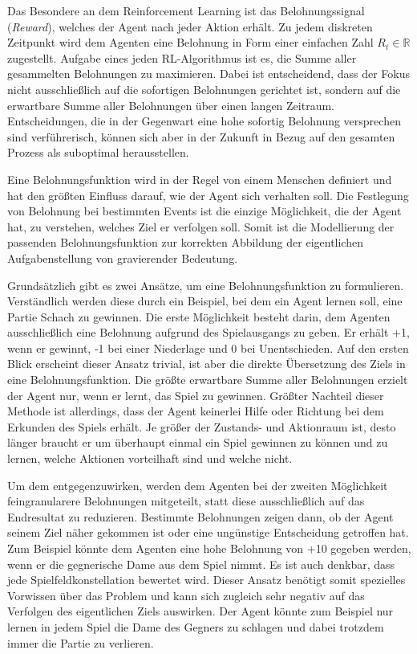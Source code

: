 Das Besondere an dem Reinforcement Learning ist das Belohnungssignal (\textit{Reward}), welches der Agent nach jeder Aktion erhält. Zu jedem diskreten Zeitpunkt wird dem Agenten eine Belohnung in Form einer einfachen Zahl $R_t \in \mathbb{R}$ zugestellt. Aufgabe eines jeden RL-Algorithmus ist es, die Summe aller gesammelten Belohnungen zu maximieren. Dabei ist entscheidend, dass der Fokus nicht ausschließlich auf die sofortigen Belohnungen gerichtet ist, sondern auf die erwartbare Summe aller Belohnungen über einen langen Zeitraum. Entscheidungen, die in der Gegenwart eine hohe sofortig Belohnung versprechen sind verführerisch, können sich aber in der Zukunft in Bezug auf den gesamten Prozess als suboptimal herausstellen. \cite[~S.53]{Sutton1998}
\par 
Eine Belohnungsfunktion wird in der Regel von einem Menschen definiert und hat den größten Einfluss darauf, wie der Agent sich verhalten soll. Die Festlegung von Belohnung bei bestimmten Events ist die einzige Möglichkeit, die der Agent hat, zu verstehen, welches Ziel er verfolgen soll. Somit ist die Modellierung der passenden Belohnungsfunktion zur korrekten Abbildung der eigentlichen Aufgabenstellung von gravierender Bedeutung.
\par 
Grundsätzlich gibt es zwei Ansätze, um eine Belohnungsfunktion zu formulieren. Verständlich werden diese durch ein Beispiel, bei dem ein Agent lernen soll, eine Partie Schach zu gewinnen. Die erste Möglichkeit besteht darin, dem Agenten ausschließlich eine Belohnung aufgrund des Spielausgangs zu geben. Er erhält +1, wenn er gewinnt, -1 bei einer Niederlage und 0 bei Unentschieden. Auf den ersten Blick erscheint dieser Ansatz trivial, ist aber die direkte Übersetzung des Ziels in eine Belohnungsfunktion. Die größte erwartbare Summe aller Belohnungen erzielt der Agent nur, wenn er lernt, das Spiel zu gewinnen. Größter Nachteil dieser Methode ist allerdings, dass der Agent keinerlei Hilfe oder Richtung bei dem Erkunden des Spiels erhält. Je größer der Zustands- und Aktionraum ist, desto länger braucht er um überhaupt einmal ein Spiel gewinnen zu können und zu lernen, welche Aktionen vorteilhaft sind und welche nicht.
\par 
Um dem entgegenzuwirken, werden dem Agenten bei der zweiten Möglichkeit feingranularere Belohnungen mitgeteilt, statt diese ausschließlich auf das Endresultat zu reduzieren. Bestimmte Belohnungen zeigen dann, ob der Agent seinem Ziel näher gekommen ist oder eine ungünstige Entscheidung getroffen hat. Zum Beispiel könnte dem Agenten eine hohe Belohnung von +10 gegeben werden, wenn er die gegnerische Dame aus dem Spiel nimmt. Es ist auch denkbar, dass jede Spielfeldkonstellation bewertet wird. Dieser Ansatz benötigt somit spezielles Vorwissen über das Problem und kann sich zugleich sehr negativ auf das Verfolgen des eigentlichen Ziels auswirken. Der Agent könnte zum Beispiel nur lernen in jedem Spiel die Dame des Gegners zu schlagen und dabei trotzdem immer die Partie zu verlieren.
